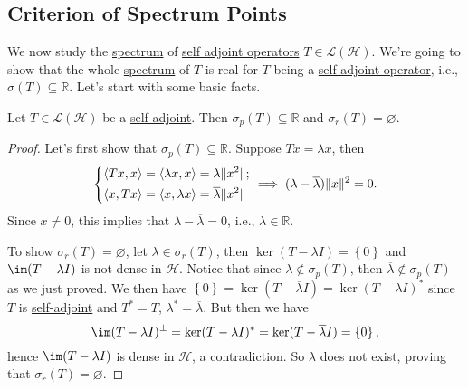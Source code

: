 \subsection{Criterion of Spectrum Points}
We now study the \hyperref[def:spectrum-point]{spectrum} of \hyperref[def:self-adjoint-op]{self adjoint operators} \(T\in \mathcal{L} (\mathcal{H} )\). We're going to show that the whole \hyperref[def:spectrum-point]{spectrum} of \(T\) is real for \(T\) being a \hyperref[def:self-adjoint-op]{self-adjoint operator}, i.e., \(\sigma (T) \subseteq \mathbb{R} \). Let's start with some basic facts.

\begin{lemma}
	Let \(T\in \mathcal{L} (\mathcal{H} )\) be a \hyperref[def:self-adjoint-op]{self-adjoint}. Then \(\sigma _p(T) \subseteq \mathbb{R} \) and \(\sigma _r(T) = \varnothing \).
\end{lemma}
\begin{proof}
	Let's first show that \(\sigma _p(T) \subseteq \mathbb{R} \). Suppose \(Tx=\lambda x\), then
	\[
		\begin{dcases}
			\left\langle Tx, x \right\rangle = \left\langle \lambda x, x \right\rangle = \lambda \lVert x^{2}  \rVert ; \\
			\left\langle x, Tx \right\rangle = \left\langle x, \lambda x \right\rangle = \overline{\lambda} \lVert x^{2}  \rVert
		\end{dcases}
		\implies (\lambda - \overline{\lambda}) \lVert x \rVert ^{2} = 0.
	\]
	Since \(x \neq 0\), this implies that \(\lambda - \overline{\lambda} = 0\), i.e., \(\lambda \in \mathbb{R} \).

	To show \(\sigma _r(T) = \varnothing \), let \(\lambda \in \sigma _r(T)\), then \(\ker (T-\lambda I) = \left\{ 0 \right\} \) and \(\im (T-\lambda I)\) is not dense in \(\mathcal{H} \). Notice that since \(\lambda \notin \sigma _p(T)\), then \(\overline{\lambda} \notin \sigma _p(T)\) as we just proved. We then have \(\left\{ 0 \right\} = \ker (T-\overline{\lambda} I) = \ker (T-\lambda I)^{\ast} \) since \(T\) is \hyperref[def:self-adjoint-op]{self-adjoint} and \(T^{\ast} = T\), \(\lambda ^{\ast} = \overline{\lambda} \). But then we have
	\[
		\im (T-\lambda I)^{\perp} = \ker (T-\lambda I)^{\ast} = \ker (T - \overline{\lambda} I) = \left\{ 0 \right\} ,
	\]
	hence \(\im (T - \lambda I)\) is dense in \(\mathcal{H} \), a contradiction. So \(\lambda \) does not exist, proving that \(\sigma _r(T)= \varnothing \).
\end{proof}